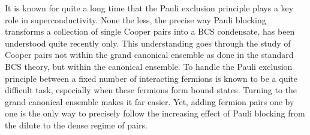 \documentclass[aps,prb,superscriptaddress,twocolumn]{revtex4}
\begin{document}









It is known for quite a long time that the Pauli exclusion principle
plays a key role in superconductivity. None the less, the
precise way Pauli blocking transforms a collection of single Cooper pairs into a BCS
condensate, has been understood quite recently only. This understanding goes through
the study of Cooper pairs not within the grand canonical ensemble as done in the
standard BCS theory, but within the canonical ensemble. To handle the
Pauli exclusion principle between a fixed number of interacting fermions is known to be a quite difficult task, especially when these fermions form bound states. Turning to the grand canonical ensemble makes it far easier. Yet, adding fermion pairs one by
one is the only way to precisely follow the increasing effect of Pauli
blocking from the dilute to the dense regime of pairs.
\end{document}
